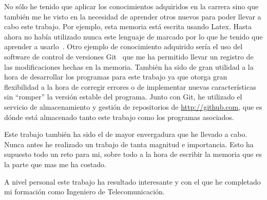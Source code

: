 No sólo he tenido que aplicar los conocimientos adquiridos en la carrera sino que también me he visto en la necesidad de aprender otros nuevos para poder llevar a cabo este trabajo. Por ejemplo, esta memoria está escrita usando Latex. Hasta ahora no había utilizado nunca este lenguaje de marcado por lo que he tenido que aprender a usarlo~\cite{website:latex-wikibooks}. Otro ejemplo de conocimiento adquirido sería el uso del software de control de versiones Git~\cite{git} que me ha permitido llevar un registro de las modificaciones hechas en la memoria. También ha sido de gran utilidad a la hora de desarrollar los programas para este trabajo ya que otorga gran flexibilidad a la hora de corregir errores o de implementar nuevas características sin “romper” la versión estable del programa. Junto con Git, he utilizado el servicio de almacenamiento y gestión de repositorios de \url{http://github.com}, que es dónde está almacenado tanto este trabajo como los programas asociados.

Este trabajo también ha sido el de mayor envergadura que he llevado a cabo. Nunca antes he realizado un trabajo de tanta magnitud e importancia. Esto ha supuesto todo un reto para mi, sobre todo a la hora de escribir la memoria que es la parte que mas me ha costado.

A nivel personal este trabajo ha resultado interesante y con el que he completado mi formación como Ingeniero de Telecomunicación.
